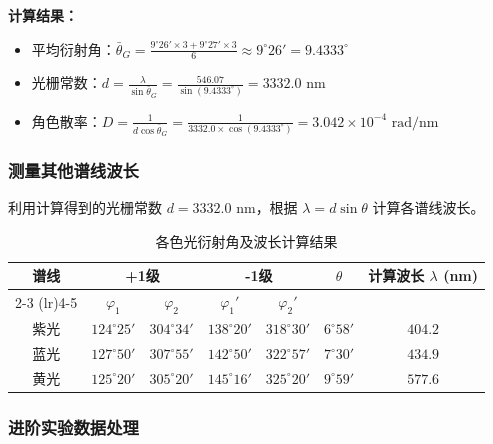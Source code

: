 \documentclass[]{../template/Report}%
\begin{document}
\begin{fullreportonly}
\textbf{计算结果：}
\begin{itemize}
    \item 平均衍射角：$\bar{\theta}_G =\frac{9^\circ 26'\times 3 + 9^\circ 27' \times 3}{6} \approx 9^\circ 26' = 9.4333^\circ$
    \item 光栅常数：$d = \frac{\lambda}{\sin \bar{\theta}_G} = \frac{546.07}{\sin(9.4333^\circ)} = 3332.0 \text{ nm}$
    \item 角色散率：$D = \frac{1}{d \cos \bar{\theta}_G} = \frac{1}{3332.0 \times \cos(9.4333^\circ)} = 3.042 \times 10^{-4} \text{ rad/nm}$
\end{itemize}

\subsubsection{测量其他谱线波长}
利用计算得到的光栅常数 $d = 3332.0 \text{ nm}$，根据 $\lambda = d \sin \theta$ 计算各谱线波长。

\begin{table}[H]
    \centering
    \caption{各色光衍射角及波长计算结果}
    \begin{tabular}{ccccccc}
        \toprule
        \multirow{2}{*}{谱线} & \multicolumn{2}{c}{+1级} & \multicolumn{2}{c}{-1级} & \multirow{2}{*}{$\theta$} & \multirow{2}{*}{计算波长 $\lambda$ (nm)} \\
        \cmidrule(lr){2-3} \cmidrule(lr){4-5}
         & $\varphi_1$ & $\varphi_2$ & $\varphi_1'$ & $\varphi_2'$ & & \\
        \midrule
        紫光 & $124^\circ 25'$ & $304^\circ 34'$ & $138^\circ 20'$ & $318^\circ 30'$ & $6^\circ 58'$ & $404.2$ \\
        蓝光 & $127^\circ 50'$ & $307^\circ 55'$ & $142^\circ 50'$ & $322^\circ 57'$ & $7^\circ 30'$ & $434.9$ \\
        黄光 & $125^\circ 20'$ & $305^\circ 20'$ & $145^\circ 16'$ & $325^\circ 20'$ & $9^\circ 59'$ & $577.6$ \\
        \bottomrule
    \end{tabular}
\end{table}


\subsubsection{进阶实验数据处理}


\end{fullreportonly}
\end{document}
